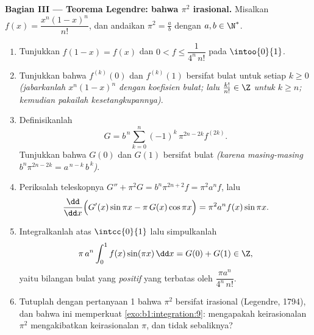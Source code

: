 \begin{problem}
\medskip
\noindent\textbf{Bagian III --- Teorema Legendre: bahwa $\pi^2$
irasional.} Misalkan $f(x) = \dfrac{x^n (1 - x)^n}{n!}$, dan andaikan
$\pi^2 = \frac ab$ dengan $a, b \in \N^*$.
\begin{enumerate}[resume]
  \item Tunjukkan $f(1 - x) = f(x)$ dan $0 < f \leq
        \dfrac{1}{4^n\,n!}$ pada $\intoo{0}{1}$.
  \item Tunjukkan bahwa $f^{(k)}(0)$ dan $f^{(k)}(1)$ bersifat bulat untuk
        setiap $k \geq 0$ \emph{(jabarkanlah $x^n(1-x)^n$ dengan koefisien
        bulat; lalu $\frac{k!}{n!} \in \Z$ untuk $k \geq n$;
        kemudian pakailah kesetangkupannya)}.
  \item Definisikanlah
        \[
        G = b^{\,n} \sum_{k=0}^{n} (-1)^k\,
        \pi^{2n - 2k} f^{(2k)} .
        \]
        Tunjukkan bahwa $G(0)$ dan $G(1)$ bersifat bulat \emph{(karena masing-masing
        $b^n \pi^{2n-2k} = a^{\,n-k}\,b^{\,k}$)}.
  \item Periksalah teleskopnya $G'' + \pi^2 G = b^n \pi^{2n+2} f
        = \pi^2 a^n f$, lalu
        \[
        \frac{\dd}{\dd x}\Bigl(G'(x)\sin \pi x - \pi\,G(x)\cos
        \pi x\Bigr) = \pi^2 a^n f(x)\sin \pi x .
        \]
  \item Integralkanlah atas $\intcc{0}{1}$ lalu simpulkanlah
        \[
        \pi\,a^n \int_0^1 f(x)\sin(\pi x)\,\dd x = G(0) + G(1)
        \in \Z ,
        \]
        yaitu bilangan bulat yang \emph{positif} yang terbatas oleh $\dfrac{\pi
        a^n}{4^n\,n!}$.
  \item Tutuplah dengan pertanyaan 1 bahwa $\pi^2$ bersifat irasional
        (Legendre, 1794), dan bahwa ini memperkuat
        \cref{exo:b1:integration:9}: mengapakah keirasionalan
        $\pi^2$ mengakibatkan keirasionalan $\pi$, dan tidak sebaliknya?
\end{enumerate}


\end{problem}
